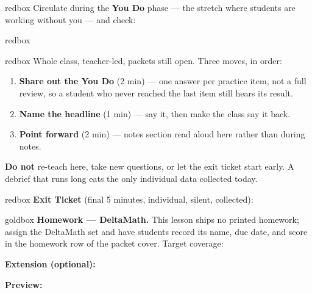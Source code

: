 \documentclass[10pt]{article}
\begin{document}
\begin{skillbox}{redbox}
Circulate during the \textbf{You Do} phase --- the stretch where students are
working without you --- and check:
\end{skillbox}

\begin{skillbox}{redbox}
\end{skillbox}

\boxguard[20]
\begin{skillbox}{redbox}
Whole class, teacher-led, packets still open. Three moves, in order:
\begin{enumerate}[itemsep=3pt]
  \item \textbf{Share out the You Do} (2 min) --- one answer per practice item,
        not a full review, so a student who never reached the last item still
        hears its result.
  \item \textbf{Name the headline} (1 min) --- say it, then make the class say it
        back. %
  \item \textbf{Point forward} (2 min) --- %
        notes section read aloud here rather than during notes.
\end{enumerate}
\textbf{Do not} re-teach here, take new questions, or let the exit ticket start
early. A debrief that runs long eats the only individual data collected today.
\end{skillbox}

\begin{skillbox}{redbox}
\textbf{Exit Ticket} (final 5 minutes, individual, silent, collected):
\end{skillbox}

\begin{skillbox}{goldbox}
\textbf{Homework --- DeltaMath.} This lesson ships no printed homework; assign the
DeltaMath set and have students record its name, due date, and score in the
homework row of the packet cover. Target coverage: %


\textbf{Extension (optional):} %

\textbf{Preview:} %
\end{skillbox}
\end{document}
